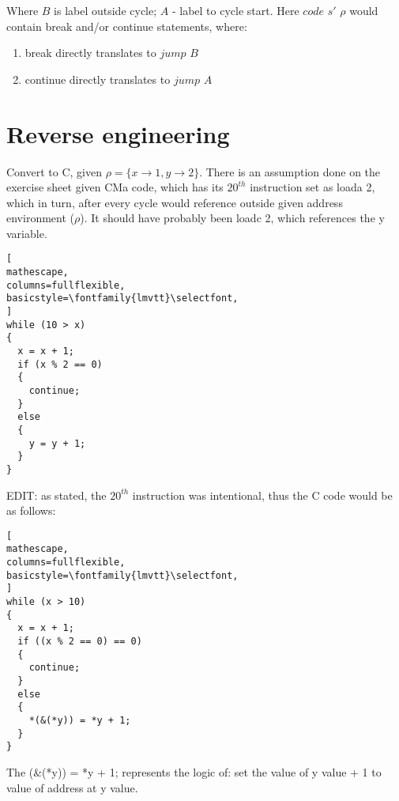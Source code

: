 \documentclass{report}
\begin{document}
Where {\color{RoyalBlue}$B$} is label outside cycle; {\color{RoyalBlue}$A$} - label to cycle start. Here {\color{OliveGreen}$code$} $s'$ $\rho$ would contain {\selectfont break} and/or {\selectfont continue} statements, where:\\
\begin{enumerate}
\item {\selectfont break} directly translates to {\color{RoyalBlue}$jump$ $B$}
\item {\selectfont continue} directly translates to {\color{RoyalBlue}$jump$ $A$}
\end{enumerate}

\section{Reverse engineering}
Convert to C, given $\rho = \{ x\to1, y\to2\}$. There is an assumption done on the exercise sheet given CMa code, which has its $20^{th}$ instruction set as {\selectfont loada 2}, which in turn, after every cycle  would reference outside given address environment ($\rho$). It should have probably been {\selectfont loadc 2}, which references the y variable.
\begin{lstlisting}[
mathescape,
columns=fullflexible,
basicstyle=\fontfamily{lmvtt}\selectfont,
]
while (10 > x)
{
  x = x + 1;
  if (x % 2 == 0)
  {
    continue;
  }
  else
  {
    y = y + 1;
  }
}
\end{lstlisting}
EDIT: as stated, the $20^{th}$ instruction was intentional, thus the C code would be as follows:
\begin{lstlisting}[
mathescape,
columns=fullflexible,
basicstyle=\fontfamily{lmvtt}\selectfont,
]
while (x > 10)
{
  x = x + 1;
  if ((x % 2 == 0) == 0)
  {
    continue;
  }
  else
  {
    *(&(*y)) = *y + 1;
  }
}
\end{lstlisting}
The {\selectfont *(\&(*y)) = *y + 1;} represents the logic of:
set the value of y value + 1 to value of address at y value.
\end{document}
